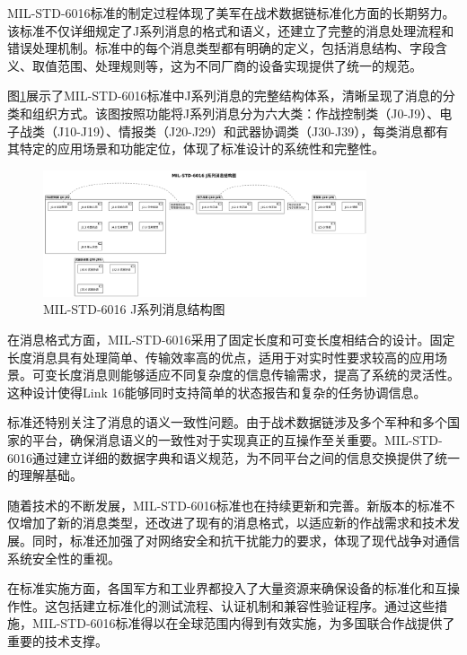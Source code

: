 MIL-STD-6016标准的制定过程体现了美军在战术数据链标准化方面的长期努力。该标准不仅详细规定了J系列消息的格式和语义，还建立了完整的消息处理流程和错误处理机制。标准中的每个消息类型都有明确的定义，包括消息结构、字段含义、取值范围、处理规则等，这为不同厂商的设备实现提供了统一的规范。

图\ref{fig_j_series_message_structure}展示了MIL-STD-6016标准中J系列消息的完整结构体系，清晰呈现了消息的分类和组织方式。该图按照功能将J系列消息分为六大类：作战控制类（J0-J9）、电子战类（J10-J19）、情报类（J20-J29）和武器协调类（J30-J39），每类消息都有其特定的应用场景和功能定位，体现了标准设计的系统性和完整性。

\begin{figure}[H]
    \centering
    \includegraphics[width=0.85\textwidth,height=0.6\textheight,keepaspectratio]{chapters/fig-0/j_series_message_structure.png}
    \caption{MIL-STD-6016 J系列消息结构图}
    \label{fig_j_series_message_structure}
\end{figure}

在消息格式方面，MIL-STD-6016采用了固定长度和可变长度相结合的设计。固定长度消息具有处理简单、传输效率高的优点，适用于对实时性要求较高的应用场景。可变长度消息则能够适应不同复杂度的信息传输需求，提高了系统的灵活性。这种设计使得Link 16能够同时支持简单的状态报告和复杂的任务协调信息。

标准还特别关注了消息的语义一致性问题。由于战术数据链涉及多个军种和多个国家的平台，确保消息语义的一致性对于实现真正的互操作至关重要。MIL-STD-6016通过建立详细的数据字典和语义规范，为不同平台之间的信息交换提供了统一的理解基础。

随着技术的不断发展，MIL-STD-6016标准也在持续更新和完善。新版本的标准不仅增加了新的消息类型，还改进了现有的消息格式，以适应新的作战需求和技术发展。同时，标准还加强了对网络安全和抗干扰能力的要求，体现了现代战争对通信系统安全性的重视。

在标准实施方面，各国军方和工业界都投入了大量资源来确保设备的标准化和互操作性。这包括建立标准化的测试流程、认证机制和兼容性验证程序。通过这些措施，MIL-STD-6016标准得以在全球范围内得到有效实施，为多国联合作战提供了重要的技术支撑。

